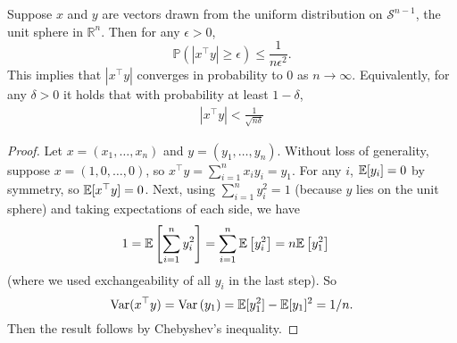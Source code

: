\begin{proposition}
Suppose \(x\) and \(y\) are vectors drawn from the uniform distribution on \(\mathcal{S}^{n-1}\), the unit sphere in \(\mathbb{R}^n\). Then for any \(\epsilon > 0\),
\[
\mathbb{P} \left(  \left| x^\top y \right| \geq \epsilon \right)  \leq \frac{1}{n\epsilon^2}.
\]
This implies that \(| x^\top y|\) converges in probability to 0 as \(n \to \infty\). Equivalently, for any \(\delta > 0\) it holds that with probability at least \(1 - \delta\),
\begin{align*}
 \left| x^\top y \right| < \frac{1}{\sqrt{n \delta}}
\end{align*}
\end{proposition}

\begin{proof}
Let \(x = (x_1, \ldots, x_n)\) and \(y = (y_1, \ldots, y_n)\). Without loss of generality, suppose \(x = (1, 0, \ldots, 0)\), so \(x^\top y = \sum_{i=1}^n x_i y_i = y_1\). For any \(i\), \(\mathbb{E}[y_i] = 0\) by symmetry, so  \(\mathbb{E}[ x^\top y] = 0\). Next, using \(\sum_{i=1}^n y_i^2 = 1\) (because \(y\) lies on the unit sphere) and taking expectations of each side, we have
\begin{align*}
1 & = \mathbb{E} \left[ \sum_{i=1}^n y_i^2 \right] =    \sum_{i=1}^n \mathbb{E} \left[ y_i^2 \right]  = n \mathbb{E} \left[ y_1^2 \right]
\end{align*}
(where we used exchangeability of all \(y_i\) in the last step). So
\[
\mathrm{Var}( x^\top y) =  \mathrm{Var}\left( y_1 \right) = \mathbb{E}[y_1^2] - \mathbb{E}[y_1]^2 = 1/n.
\]
Then the result follows by Chebyshev's inequality.
\end{proof}
%

